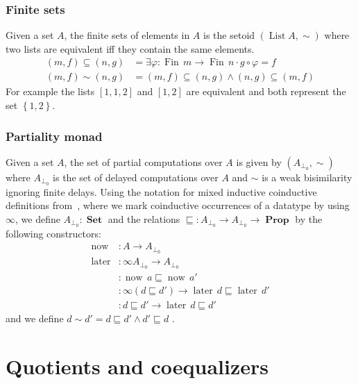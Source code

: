 \documentclass[envcountsame]{llncs}
\providecommand{\set}  [1]{\left\{#1\right\}}
\DeclareMathOperator{\Prop}{\mathbf{Prop}}
\DeclareMathOperator{\Set}{\mathbf{Set}}
\DeclareMathOperator{\List}{List}
\DeclareMathOperator{\Fin}{Fin}
\DeclareMathOperator{\now}{now}
\DeclareMathOperator{\later}{later}
\DeclareMathOperator{\nowequal}{now_\sqsubseteq}
\DeclareMathOperator{\laterequal}{later_\sqsubseteq}
\DeclareMathOperator{\laterleft}{later_{left}}
\begin{document}
\subsubsection*{Finite sets}
Given a set $A$, the finite sets of elements in $A$ is the setoid $(\List A,{\sim})$ where two lists are equivalent if{f} they contain the same elements.
\begin{align*}
(m,f)\subseteq(n,g) &= \exists \varphi : \Fin\,m \to \Fin\,n \cdot  g\circ\varphi = f  \\
(m,f)\sim(n,g)&= (m,f)\subseteq(n,g) \wedge (n,g)\subseteq(m,f)
\end{align*}
For example the lists $[1,1,2]$ and $[1,2]$ are equivalent and both represent the set $\set{1,2}$.
\subsubsection*{Partiality monad}
Given a set $A$, the set of partial computations over $A$ is given by $(A_{\bot_0},{\sim})$ where $A_{\bot_0}$ is the set of delayed computations over $A$  and $\sim$ is a weak bisimilarity ignoring finite delays. Using the notation for mixed inductive coinductive  definitions from~\cite{danielsson2010mpc}, where we mark coinductive occurrences of a datatype by using $\infty$, we define $A_{\bot_0} : \Set$ and the relations $\sqsubseteq:A_{\bot_0}\to A_{\bot_0} \to \Prop$ by the following constructors:
\begin{align*}
\now  &: A \to A_{\bot_0}\\
\later &: \infty A_{\bot_0} \to  A_{\bot_0}\\
\nowequal &: \now\, a \sqsubseteq \now\,a'\\
\laterequal &: \infty(d \sqsubseteq d') \to \later\,d \sqsubseteq \later\,d'\\
\laterleft &: d\sqsubseteq d' \to \later\,d \sqsubseteq d'
\end{align*}
and we define $d\sim d'= d\sqsubseteq d' \wedge d'\sqsubseteq d$ .

\section{Quotients and coequalizers}\label{sec:quotients}
\end{document}

